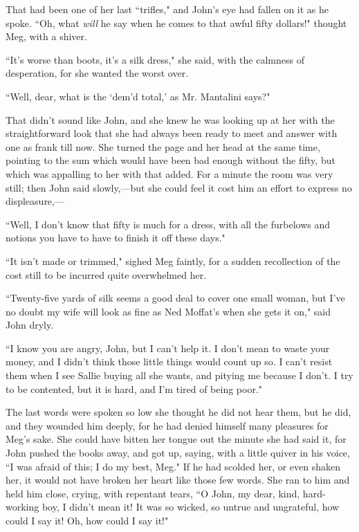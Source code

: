 That had been one of her last ``trifles," and John's eye
had fallen on it as he spoke. ``Oh, what \emph{will} he say when he comes
to that awful fifty dollars!" thought Meg, with a shiver.

``It's worse than boots, it's a silk
dress," she said, with the calmness of desperation, for she wanted the
worst over.

``Well, dear, what is the `dem'd
total,' as Mr. Mantalini says?"

That didn't sound like John, and she knew he was looking
up at her with the straightforward look that she had always been ready
to meet and answer with one as frank till now. She turned the page and
her head at the same time, pointing to the sum which would have been bad
enough without the fifty, but which was appalling to her with that
added. For a minute the room was very still; then John said
slowly,---but she could feel it cost him an effort to express no
displeasure,---

``Well, I don't know that fifty is much for a dress, with
all the furbelows and notions you have to have to finish it off these
days."

``It isn't made or trimmed," sighed Meg faintly, for a
sudden recollection of the cost still to be incurred quite overwhelmed
her.

``Twenty-five yards of silk seems a good deal to cover one small woman,
but I've no doubt my wife will look as fine as Ned
Moffat's when she gets it on," said John dryly.

``I know you are angry, John, but I can't help it. I
don't mean to waste your money, and I
didn't think those little things would count up so. I
can't resist them when I see Sallie buying all she
wants, and pitying me because I don't. I try to be
contented, but it is hard, and I'm tired of being poor."

The last words were spoken so low she thought he did not hear them, but
he did, and they wounded him deeply, for he had denied himself many
pleasures for Meg's sake. She could have bitten her
tongue out the minute she had said it, for John pushed the books away,
and got up, saying, with a little quiver in his voice, ``I was afraid of
this; I do my best, Meg." If he had scolded her, or even shaken her, it
would not have broken her heart like those few words. She ran to him and
held him close, crying, with repentant tears, ``O John, my dear, kind,
hard-working boy, I didn't mean it! It was so wicked, so
untrue and ungrateful, how could I say it! Oh, how could I say it!"

